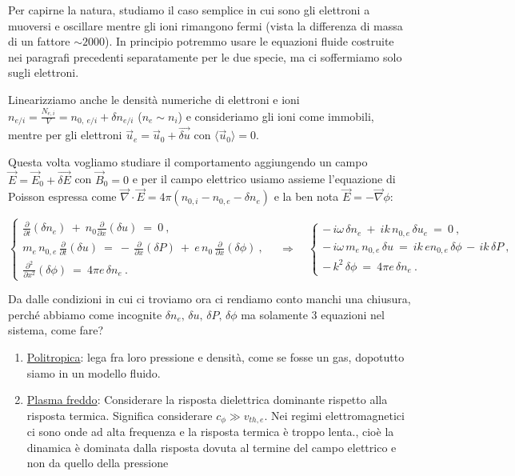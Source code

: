 Per capirne la natura, studiamo il caso semplice in cui sono gli elettroni a muoversi e oscillare mentre gli ioni rimangono fermi (vista la differenza di massa di un fattore $\sim2000$). In principio potremmo usare le equazioni fluide costruite nei paragrafi precedenti separatamente per le due specie, ma ci soffermiamo solo sugli elettroni.

Linearizziamo anche le densità numeriche di elettroni e ioni $n_{e/i} = \displaystyle\frac{N_{e,i}}{V} = n_{0,\ e/i} + \delta n_{e/i}$ ($n_e\sim n_i$) e consideriamo gli ioni come immobili, mentre per gli elettroni $\vec u_e = \vec u_0 + \vec{\delta u}$ con $\langle \vec u_0 \rangle = 0$.

Questa volta vogliamo studiare il comportamento aggiungendo un campo $\vec E = \vec E_0 + \vec{\delta E}$ con $\vec B_0 = 0$ e per il campo elettrico usiamo assieme l'equazione di Poisson espressa come $\vec \nabla \cdot \vec E = 4\pi(n_{0, i}-n_{0, e}-\delta n_e)$ e la ben nota $\vec E = -\vec \nabla \phi$:

\[
\begin{cases}
	\displaystyle\frac{\partial}{\partial t}(\delta n_e)\ +\ n_0\frac{\partial}{\partial x}(\delta u)\ =\ 0\ ,\\
	m_e\, n_{0, e}\, \displaystyle\frac{\partial }{\partial t}(\delta u)\ =\ -\, \frac{\partial }{\partial x}(\delta P)\ +\ e\, n_0\, \frac{\partial}{\partial x}(\delta\phi)\ ,\\
	\displaystyle\frac{\partial ^2}{\partial x^2}(\delta\phi)\ =\ 4\pi e\,\delta n_e\ .
\end{cases}
\quad  \Rightarrow \quad 
\begin{cases}
	-\, i\omega\,\delta n_e\ +\ i k\, n_{0, e}\,\delta u_e\ =\ 0\ , \\
	-\, i\omega\, m_e\, n_{0, e}\, \delta u\ =\ ik\, e n_{0, e}\, \delta \phi\, -\, ik\,\delta P\ , \\
	-\,k^2\, \delta \phi\ =\ 4\pi e\, \delta n_e\ .
\end{cases}
\] 

Da dalle condizioni in cui ci troviamo ora ci rendiamo conto manchi una chiusura, perché abbiamo come incognite $\delta n_e,\, \delta u,\, \delta P,\, \delta \phi$ ma solamente 3 equazioni nel sistema, come fare?
\begin{enumerate}
	\item \underline{Politropica}: lega fra loro pressione e densità, come se fosse un gas, dopotutto siamo in un modello fluido.
	\item \underline{Plasma freddo}: Considerare la risposta dielettrica dominante rispetto alla risposta termica. Significa considerare $c_\phi\gg v_{th,e}$. Nei regimi elettromagnetici ci sono onde ad alta frequenza e la risposta termica è troppo lenta., cioè la dinamica è dominata dalla risposta dovuta al termine del campo elettrico e non da quello della pressione
\end{enumerate} 


